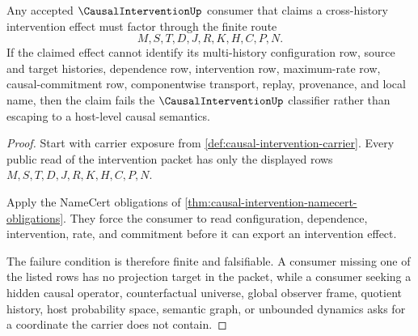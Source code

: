 \begin{theorem}
\label{thm:causal-intervention-falsifiable-nonescape}
Any accepted $\CausalInterventionUp$ consumer that claims a cross-history intervention effect must factor through the finite route
$$
M,S,T,D,J,R,K,H,C,P,N.
$$
If the claimed effect cannot identify its multi-history configuration row, source and target histories, dependence row, intervention row, maximum-rate row, causal-commitment row, componentwise transport, replay, provenance, and local name, then the claim fails the $\CausalInterventionUp$ classifier rather than escaping to a host-level causal semantics.
\end{theorem}
\begin{proof}
Start with carrier exposure from \autoref{def:causal-intervention-carrier}. Every public read of the intervention packet has only the displayed rows $M,S,T,D,J,R,K,H,C,P,N$.

Apply the NameCert obligations of \autoref{thm:causal-intervention-namecert-obligations}. They force the consumer to read configuration, dependence, intervention, rate, and commitment before it can export an intervention effect.

The failure condition is therefore finite and falsifiable. A consumer missing one of the listed rows has no projection target in the packet, while a consumer seeking a hidden causal operator, counterfactual universe, global observer frame, quotient history, host probability space, semantic graph, or unbounded dynamics asks for a coordinate the carrier does not contain.
\end{proof}



